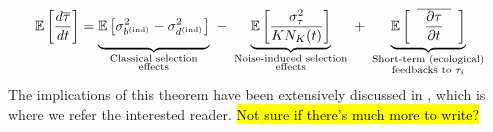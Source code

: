 \begin{equation}
\label{nD_stochastic_Fisher_turnover}
\mathbb{E}\left[\frac{d\overline{\tau}}{dt}\right] = \underbrace{\vphantom{ \mathbb{E}\left[\frac{\sigma^2_{\tau}}{KN_K(t)}\right] } \mathbb{E}\left[\sigma^2_{b^{\textrm{(ind)}}} - \sigma^2_{d^{\textrm{(ind)}}}\right]}_{\substack{\text{Classical selection} \\ \text{effects}}} \ - \ \underbrace{ \mathbb{E}\left[\frac{\sigma^2_{\tau}}{KN_K(t)}\right]}_{\substack{\text{Noise-induced selection} \\ \text{effects}}} \ + \ \underbrace{ \vphantom{ \mathbb{E}\left[\frac{\sigma^2_{\tau}}{KN_K(t)}\right] } \mathbb{E}\left[\hphantom{a}\overline{\hphantom{a}\frac{\partial \tau}{\partial t}\hphantom{a}}\hphantom{a}\right]}_{\substack{\text{Short-term (ecological)} \\ \text{feedbacks to $\tau_i$}}}
\end{equation}
The implications of this theorem have been extensively discussed in \citep{kuosmanen_turnover_2022}, which is where we refer the interested reader.
\hl{Not sure if there's much more to write?}


